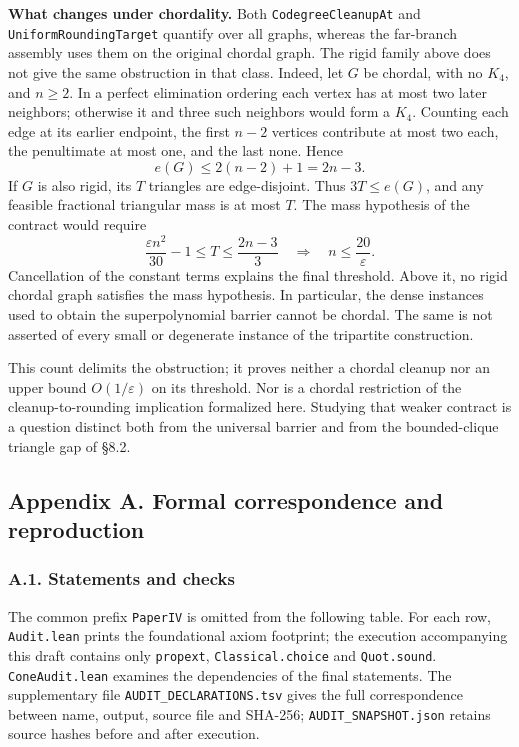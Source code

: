 \documentclass[english,11pt,a4paper]{article}
\newcounter{none}
\begin{document}
\textbf{What changes under chordality.} Both \nolinkurl{CodegreeCleanupAt} and \nolinkurl{UniformRoundingTarget} quantify over all graphs, whereas the far-branch assembly uses them on the original chordal graph. The rigid family above does not give the same obstruction in that class. Indeed, let \(G\) be chordal, with no \(K_4\), and \(n\ge2\). In a perfect elimination ordering each vertex has at most two later neighbors; otherwise it and three such neighbors would form a \(K_4\). Counting each edge at its earlier endpoint, the first \(n-2\) vertices contribute at most two each, the penultimate at most one, and the last none. Hence \[
e(G)\le2(n-2)+1=2n-3.
\tag{8.4}
\] If \(G\) is also rigid, its \(T\) triangles are edge-disjoint. Thus \(3T\le e(G)\), and any feasible fractional triangular mass is at most \(T\). The mass hypothesis of the contract would require \[
\frac{\varepsilon n^2}{30}-1
\le T\le\frac{2n-3}{3}
\quad\Longrightarrow\quad n\le\frac{20}{\varepsilon}.
\tag{8.5}
\] Cancellation of the constant terms explains the final threshold. Above it, no rigid chordal graph satisfies the mass hypothesis. In particular, the dense instances used to obtain the superpolynomial barrier cannot be chordal. The same is not asserted of every small or degenerate instance of the tripartite construction.

This count delimits the obstruction; it proves neither a chordal cleanup nor an upper bound \(O(1/\varepsilon)\) on its threshold. Nor is a chordal restriction of the cleanup-to-rounding implication formalized here. Studying that weaker contract is a question distinct both from the universal barrier and from the bounded-clique triangle gap of §8.2.

\subsection{Appendix A. Formal correspondence and reproduction}\label{appendix-a.-formal-correspondence-and-reproduction}

\subsubsection{A.1. Statements and checks}\label{a.1.-statements-and-checks}

The common prefix \nolinkurl{PaperIV} is omitted from the following table. For each row, \nolinkurl{Audit.lean} prints the foundational axiom footprint; the execution accompanying this draft contains only \nolinkurl{propext}, \nolinkurl{Classical.choice} and \nolinkurl{Quot.sound}. \nolinkurl{ConeAudit.lean} examines the dependencies of the final statements. The supplementary file \nolinkurl{AUDIT_DECLARATIONS.tsv} gives the full correspondence between name, output, source file and SHA-256; \nolinkurl{AUDIT_SNAPSHOT.json} retains source hashes before and after execution.
\end{document}
